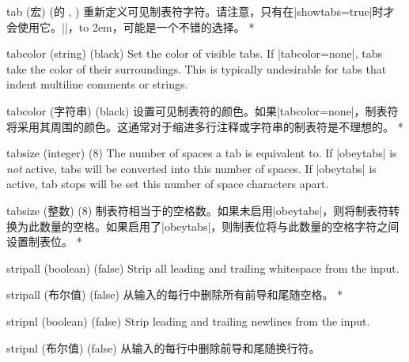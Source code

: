 \begin{optionlist}
\begin{paracol}{2}
\switchcolumn
\item[tab (宏) ({\rmfamily\pkg{fancyvrb}的} \string\FancyVerbTab, \FancyVerbTab)]
重新定义可见制表符字符。请注意，只有在|showtabs=true|时才会使用它。|\rightarrowfill|，\hbox to 2em{\rightarrowfill}，可能是一个不错的选择。
\switchcolumn[0]*%
\item[tabcolor (string) (black)]
Set the color of visible tabs.  If |tabcolor=none|, tabs take the color of their surroundings.  This is typically undesirable for tabs that indent multiline comments or strings.
\switchcolumn
\item[tabcolor (字符串) (black)]
设置可见制表符的颜色。如果|tabcolor=none|，制表符将采用其周围的颜色。这通常对于缩进多行注释或字符串的制表符是不理想的。
\switchcolumn[0]*%
\item[tabsize (integer) (8)]
The number of spaces a tab is equivalent to.  If |obeytabs| is \emph{not} active, tabs will be converted into this number of spaces.  If |obeytabs| is active, tab stops will be set this number of space characters apart.
\switchcolumn
\item[tabsize (整数) (8)]
制表符相当于的空格数。如果未启用|obeytabs|，则将制表符转换为此数量的空格。如果启用了|obeytabs|，则制表位将与此数量的空格字符之间设置制表位。
\switchcolumn[0]*%
\item[stripall (boolean) (false)]
Strip all leading and trailing whitespace from the input.
\switchcolumn
\item[stripall (布尔值) (false)]
从输入的每行中删除所有前导和尾随空格。
\switchcolumn[0]*%
\item[stripnl (boolean) (false)]
Strip leading and trailing newlines from the input.
\switchcolumn
\item[stripnl (布尔值) (false)]
从输入的每行中删除前导和尾随换行符。
\end{paracol}
\end{optionlist}
